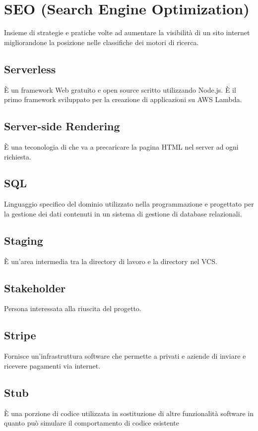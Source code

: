\section{}
\section*{SEO (Search Engine Optimization)} Insieme di strategie e pratiche volte ad aumentare la visibilità di un sito internet migliorandone la posizione nelle classifiche dei motori di ricerca.
\subsection*{Serverless} È un framework Web gratuito e open source scritto utilizzando Node.js. È il primo framework sviluppato
per la creazione di applicazioni su AWS Lambda.

\subsection*{Server-side Rendering} È una teconologia di che va a precaricare la pagina HTML nel server ad ogni richiesta.

\subsection*{SQL} Linguaggio specifico del dominio utilizzato nella programmazione e progettato per la gestione dei dati
contenuti in un sistema di gestione di database relazionali.

\subsection*{Staging} È un'area intermedia tra la directory di lavoro e la directory nel VCS.

\subsection*{Stakeholder} Persona interessata alla riuscita del progetto.

\subsection*{Stripe} Fornisce un'infrastruttura software che permette a privati e aziende di inviare e ricevere pagamenti via internet.

\subsection*{Stub} È una porzione di codice utilizzata in sostituzione di altre funzionalità software in quanto può simulare il comportamento di codice esistente